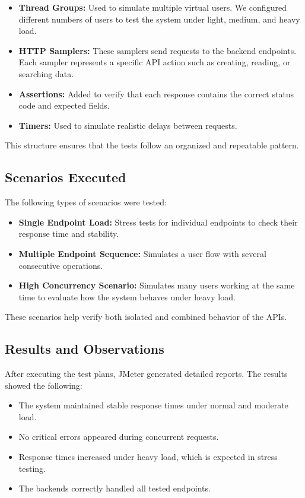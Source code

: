 \documentclass[12pt,a4paper]{article}
\begin{document}
\begin{itemize}
	\item \textbf{Thread Groups:} Used to simulate multiple virtual users. We configured different numbers of users to test the system under light, medium, and heavy load.
	\item \textbf{HTTP Samplers:} These samplers send requests to the backend endpoints. Each sampler represents a specific API action such as creating, reading, or searching data.
	\item \textbf{Assertions:} Added to verify that each response contains the correct status code and expected fields.
	\item \textbf{Timers:} Used to simulate realistic delays between requests.
\end{itemize}

This structure ensures that the tests follow an organized and repeatable pattern.

\subsection{Scenarios Executed}

The following types of scenarios were tested:

\begin{itemize}
	\item \textbf{Single Endpoint Load:} Stress tests for individual endpoints to check their response time and stability.
	\item \textbf{Multiple Endpoint Sequence:} Simulates a user flow with several consecutive operations.
	\item \textbf{High Concurrency Scenario:} Simulates many users working at the same time to evaluate how the system behaves under heavy load.
\end{itemize}

These scenarios help verify both isolated and combined behavior of the APIs.

\subsection{Results and Observations}

After executing the test plans, JMeter generated detailed reports. The results showed the following:

\begin{itemize}
	\item The system maintained stable response times under normal and moderate load.
	\item No critical errors appeared during concurrent requests.
	\item Response times increased under heavy load, which is expected in stress testing.
	\item The backends correctly handled all tested endpoints.
\end{itemize}
\end{document}
